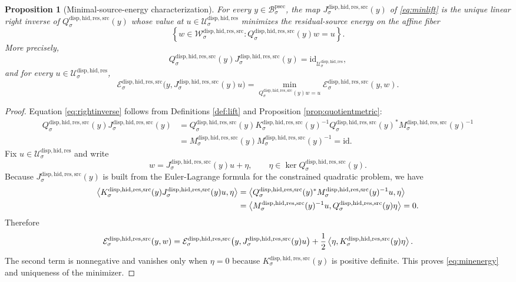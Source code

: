 \documentclass[11pt]{article}
\newcommand{\ProtoSectionBody}[1]{\mathcal B_{#1}^{\mathrm{psec}}}
\newcommand{\ResidualState}[1]{\mathcal U_{#1}^{\mathrm{disp,hid,res}}}
\newcommand{\ResidualSourceCarrier}[1]{\mathcal W_{#1}^{\mathrm{disp,hid,res,src}}}
\newcommand{\ResidualSourceProjection}[1]{Q_{#1}^{\mathrm{disp,hid,res,src}}}
\newcommand{\ResidualSourceOperator}[1]{K_{#1}^{\mathrm{disp,hid,res,src}}}
\newcommand{\ResidualSourceLift}[1]{J_{#1}^{\mathrm{disp,hid,res,src}}}
\newcommand{\ResidualSourceQuotientMetric}[1]{M_{#1}^{\mathrm{disp,hid,res,src}}}
\newcommand{\ResidualSourceEnergy}[1]{\mathcal E_{#1}^{\mathrm{disp,hid,res,src}}}
\newtheorem{proposition}{Proposition}
\begin{document}
\begin{proposition}[Minimal-source-energy characterization]
\label{prop:minlift}
For every \(y\in\ProtoSectionBody{\sigma}\), the map \(\ResidualSourceLift{\sigma}(y)\) of \eqref{eq:minlift} is the unique linear right inverse of \(\ResidualSourceProjection{\sigma}(y)\) whose value at \(u\in\ResidualState{\sigma}\) minimizes the residual-source energy on the affine fiber
\[
\left\{
w\in\ResidualSourceCarrier{\sigma}:
\ResidualSourceProjection{\sigma}(y)w=u
\right\}.
\]
More precisely,
\begin{equation}
\ResidualSourceProjection{\sigma}(y)\ResidualSourceLift{\sigma}(y)
=
\mathrm{id}_{\ResidualState{\sigma}},
\label{eq:rightinverse}
\end{equation}
and for every \(u\in\ResidualState{\sigma}\),
\begin{equation}
\ResidualSourceEnergy{\sigma}\bigl(y,\ResidualSourceLift{\sigma}(y)u\bigr)
=
\min_{\ResidualSourceProjection{\sigma}(y)w=u}
\ResidualSourceEnergy{\sigma}(y,w).
\label{eq:minenergy}
\end{equation}
\end{proposition}

\begin{proof}
Equation \eqref{eq:rightinverse} follows from Definitions \ref{def:lift} and Proposition \ref{prop:quotientmetric}:
\[
\begin{aligned}
\ResidualSourceProjection{\sigma}(y)\ResidualSourceLift{\sigma}(y)
&=
\ResidualSourceProjection{\sigma}(y)
\ResidualSourceOperator{\sigma}(y)^{-1}
\ResidualSourceProjection{\sigma}(y)^*
\ResidualSourceQuotientMetric{\sigma}(y)^{-1}\\
&=
\ResidualSourceQuotientMetric{\sigma}(y)
\ResidualSourceQuotientMetric{\sigma}(y)^{-1}
=
\mathrm{id}.
\end{aligned}
\]
Fix \(u\in\ResidualState{\sigma}\) and write
\[
w=\ResidualSourceLift{\sigma}(y)u+\eta,
\qquad
\eta\in\ker \ResidualSourceProjection{\sigma}(y).
\]
Because \(\ResidualSourceLift{\sigma}(y)\) is built from the Euler-Lagrange formula for the constrained quadratic problem, we have
\[
\begin{aligned}
\ev{
\ResidualSourceOperator{\sigma}(y)\ResidualSourceLift{\sigma}(y)u,
\eta
}
&=
\ev{
\ResidualSourceProjection{\sigma}(y)^*
\ResidualSourceQuotientMetric{\sigma}(y)^{-1}u,
\eta
}\\
&=
\ev{
\ResidualSourceQuotientMetric{\sigma}(y)^{-1}u,
\ResidualSourceProjection{\sigma}(y)\eta
}
=
0.
\end{aligned}
\]
Therefore
\[
\ResidualSourceEnergy{\sigma}(y,w)
=
\ResidualSourceEnergy{\sigma}\bigl(y,\ResidualSourceLift{\sigma}(y)u\bigr)
+
\frac{1}{2}
\ev{
\eta,\ResidualSourceOperator{\sigma}(y)\eta
}.
\]
The second term is nonnegative and vanishes only when \(\eta=0\) because \(\ResidualSourceOperator{\sigma}(y)\) is positive definite. This proves \eqref{eq:minenergy} and uniqueness of the minimizer.
\end{proof}
\end{document}
